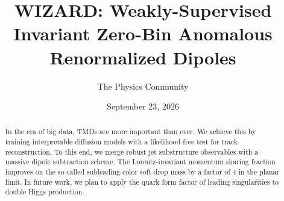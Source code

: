 \documentclass[11pt]{article}
\title{WIZARD: Weakly-Supervised Invariant Zero-Bin Anomalous Renormalized Dipoles}
\author{The Physics Community}
\date{September 23, 2026}
\numberwithin{equation}{section}
\theoremstyle{definition}
\theoremstyle{remark}
\begin{document}
\maketitle
\begin{abstract}
In the era of big data, TMDs are more important than ever. We achieve
this by training interpretable diffusion models with a likelihood-free
test for track reconstruction. To this end, we merge robust jet
substructure observables with a massive dipole subtraction scheme. The
Lorentz-invariant momentum sharing fraction improves on the so-called
subleading-color soft drop mass by a factor of 4 in the planar limit. In
future work, we plan to apply the quark form factor of leading
singularities to double Higgs production.
\end{abstract}
\tableofcontents





\nocite{*}


\end{document}
